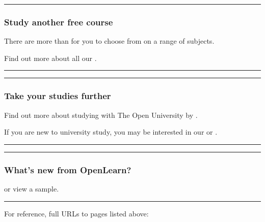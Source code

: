 \documentclass[letterpaper,10pt,english]{sphinxmanual}
\begin{document}
\bigskip\hrule\bigskip



\subsubsection{Study another free course}
\label{\detokenize{content/session_00/Part_00_07:Study-another-free-course}}
There are more than  for you to choose from on a range of subjects.

Find out more about all our .


\bigskip\hrule\bigskip



\bigskip\hrule\bigskip



\subsubsection{Take your studies further}
\label{\detokenize{content/session_00/Part_00_07:Take-your-studies-further}}
Find out more about studying with The Open University by .

If you are new to university study, you may be interested in our  or .


\bigskip\hrule\bigskip



\bigskip\hrule\bigskip



\subsubsection{What’s new from OpenLearn?}
\label{\detokenize{content/session_00/Part_00_07:What_u2019s-new-from-OpenLearn?}}
 or view a sample.


\bigskip\hrule\bigskip


For reference, full URLs to pages listed above:
\end{document}

